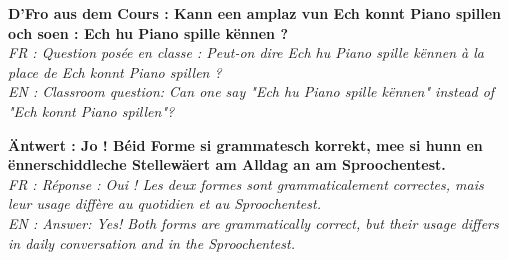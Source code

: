 \textbf{D'Fro aus dem Cours : Kann een amplaz vun \flqq Ech konnt Piano spillen\frqq{} och soen : \flqq Ech hu Piano spille kënnen\frqq{} ?} \\
\textit{FR : Question posée en classe : Peut-on dire \flqq Ech hu Piano spille kënnen\frqq{} à la place de \flqq Ech konnt Piano spillen\frqq{} ?} \\
\textit{EN : Classroom question: Can one say "Ech hu Piano spille kënnen" instead of "Ech konnt Piano spillen"?}

\vspace{0.4em}

\textbf{Äntwert : Jo ! Béid Forme si grammatesch korrekt, mee si hunn en ënnerschiddleche Stellewäert am Alldag an am Sproochentest.} \\
\textit{FR : Réponse : Oui ! Les deux formes sont grammaticalement correctes, mais leur usage diffère au quotidien et au Sproochentest.} \\
\textit{EN : Answer: Yes! Both forms are grammatically correct, but their usage differs in daily conversation and in the Sproochentest.}

